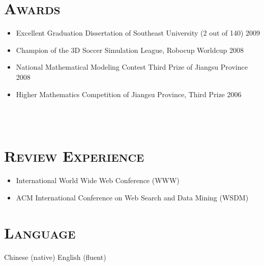 \begin{resume}
\section{\textsc{Awards}}
\begin{itemize}
\item Excellent Graduation Dissertation of Southeast University (2 out of 140) \hfill  2009
\item Champion of the 3D Soccer Simulation League, Robocup Worldcup \hfill 2008
\item National Mathematical Modeling Contest Third Prize of Jiangsu Province \hfill  2008
\item Higher Mathematics Competition of Jiangsu Province, Third Prize \hfill 2006
\end{itemize}

\begin{formatb}
  \\
  \body\\
\end{formatb}

\section{\textsc{Review Experience}}
\begin{itemize}
  \item International World Wide Web Conference (WWW)
  \item ACM International Conference on Web Search and Data Mining (WSDM)
\end{itemize}


\section{\textsc{Language}}
Chinese (native) \hspace{3cm} English (fluent)





\end{resume}

